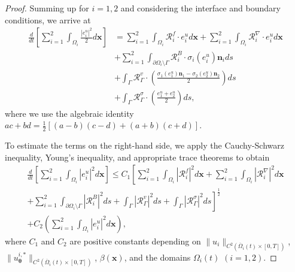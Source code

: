 \documentclass[10pt,a4paper]{amsart}
\begin{document}
\begin{proof}
Summing up for $i = 1, 2$ and considering the interface and boundary conditions, we arrive at
\begin{equation}
\begin{aligned}
\frac{d}{dt}\left[\sum_{i=1}^{2} \int_{\Omega_i} \frac{|e^u_i|^2}{2} d\boldsymbol{x}\right] 
&= \sum_{i=1}^{2} \int_{\Omega_i} \mathcal{R}^f_i \cdot e^u_i d\boldsymbol{x} + \sum_{i=1}^{2} \int_{\Omega_i} \mathcal{R}^{\nabla}_i \cdot e^u_i d\boldsymbol{x} \\
&+ \sum_{i=1}^{2} \int_{\partial\Omega_i \setminus \Gamma} \mathcal{R}^{B}_i \cdot \sigma_i(e^u_i) \boldsymbol{n}_i ds \\
&+ \int_{\Gamma} \mathcal{R}^v_{\Gamma} \cdot \left(\frac{\sigma_1(e^u_1)\boldsymbol{n}_1 - \sigma_2(e^u_2)\boldsymbol{n}_2}{2}\right) ds \\
&+ \int_{\Gamma} \mathcal{R}^{\sigma}_{\Gamma} \cdot \left(\frac{e^u_1 + e^u_2}{2}\right) ds,
\end{aligned}
\end{equation}
where we use the algebraic identity $ac + bd = \frac{1}{2}[(a-b)(c-d) + (a+b)(c+d)]$. 

To estimate the terms on the right-hand side, we apply the Cauchy-Schwarz inequality, Young's inequality, and appropriate trace theorems to obtain
\begin{equation}
\begin{aligned}
\frac{d}{dt}\left[\sum_{i=1}^{2} \int_{\Omega_i} |e^u_i|^2 d\boldsymbol{x}\right] \leq C_1 \left[\sum_{i=1}^{2} \int_{\Omega_i} |\mathcal{R}^f_i|^2 d\boldsymbol{x} + \sum_{i=1}^{2} \int_{\Omega_i} |\mathcal{R}^{\nabla}_i|^2 d\boldsymbol{x} \right. \\
\left. + \sum_{i=1}^{2} \int_{\partial\Omega_i \setminus \Gamma} |\mathcal{R}^{B}_i|^2 ds + \int_{\Gamma} |\mathcal{R}^v_{\Gamma}|^2 ds + \int_{\Gamma} |\mathcal{R}^{\sigma}_{\Gamma}|^2 ds\right]^{\frac{1}{2}} \\
+ C_2 \left(\sum_{i=1}^{2} \int_{\Omega_i} |e^u_i|^2 d\boldsymbol{x}\right),
\end{aligned}
\end{equation}
where $C_1$ and $C_2$ are positive constants depending on $\|u_i\|_{C^2(\overline{\Omega}_i(t) \times [0,T])}$, $\|u_{\boldsymbol{\theta}}^{i,*}\|_{C^2(\overline{\Omega}_i(t) \times [0,T])}$, $\beta(\boldsymbol{x})$, and the domains $\Omega_i(t)$ $(i = 1, 2)$. 


\end{proof}
\end{document}
